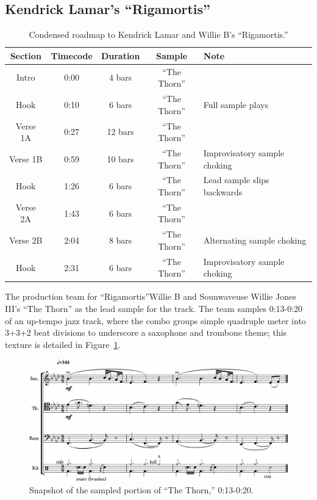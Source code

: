 \subsection*{\centering Kendrick Lamar's ``Rigamortis''}
    \begin{table}[ht]
        \centering
            \begin{tabular}{|c|c|c|c|l|}
                \hline
                Section  & Timecode & Duration & Sample        & Note \\ \hline
                Intro    & 0:00     & 4 bars   & ``The Thorn'' & \\ \hline
                Hook     & 0:10     & 6 bars   & ``The Thorn'' & Full sample plays \\ \hline
                Verse 1A & 0:27     & 12 bars  & ``The Thorn'' & \\ \hline
                Verse 1B & 0:59     & 10 bars  & ``The Thorn'' & Improvisatory sample choking \\ \hline
                Hook     & 1:26     & 6 bars   & ``The Thorn'' & Lead sample slips backwards \\ \hline
                Verse 2A & 1:43     & 6 bars   & ``The Thorn'' & \\ \hline
                Verse 2B & 2:04     & 8 bars   & ``The Thorn'' & Alternating sample choking \\ \hline
                Hook     & 2:31     & 6 bars   & ``The Thorn'' & Improvisatory sample choking\\ \hline
            \end{tabular}
        \caption{Condensed roadmap to Kendrick Lamar and Willie B's ``Rigamortis.''}
        \label{tab:rigamortis}
    \end{table}

The production team for ``Rigamortis''\textemdash Willie B and Sounwave\textemdash use Willie Jones III's ``The Thorn'' as the lead sample for the track. The team samples 0:13-0:20 of an up-tempo jazz track, where the combo groups simple quadruple meter into 3+3+2 beat divisions to underscore a saxophone and trombone theme; this texture is detailed in Figure~\ref{fig:thethornfull}.

    \begin{figure}[ht]
        \centering
        \includegraphics[width=\textwidth]{images/figures/chp 02/013020thethornfull.pdf}
        \caption{Snapshot of the sampled portion of ``The Thorn,'' 0:13-0:20.}
        \label{fig:thethornfull}
    \end{figure}

